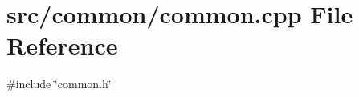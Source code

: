 \section{src/common/common.cpp File Reference}
\label{common_8cpp}
{\ttfamily \#include \char`\"{}common.\+h\char`\"{}}\newline
